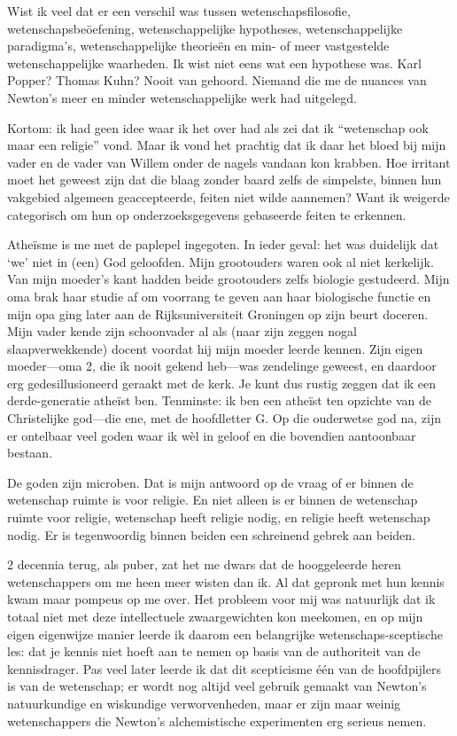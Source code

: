 \documentclass[12pt,a4paper]{article}
\begin{document}
Wist ik veel dat er een verschil was tussen wetenschapsfilosofie, weten\-schaps\-beöef\-ening, wetenschappelijke hypotheses, wetenschappelijke paradigma's, wetenschappelijke theorieën en min- of meer vastgestelde wetenschappelijke waarheden. Ik wist niet eens wat een hypothese was. Karl Popper? Thomas Kuhn? Nooit van gehoord. Niemand die me de nuances van Newton's meer en minder wetenschappelijke werk had uitgelegd.

Kortom: ik had geen idee waar ik het over had als zei dat ik “wetenschap ook maar een religie” vond. Maar ik vond het prachtig dat ik daar het bloed bij mijn vader en de vader van Willem onder de nagels vandaan kon krabben. Hoe irritant moet het geweest zijn dat die blaag zonder baard zelfs de simpelste, binnen hun vakgebied algemeen geaccepteerde, feiten niet wilde aannemen? Want ik weigerde categorisch om hun op onderzoeksgegevens gebaseerde feiten te erkennen.

Atheïsme is me met de paplepel ingegoten. In ieder geval: het was duidelijk dat ‘we’ niet in (een) God geloofden. Mijn grootouders waren ook al niet kerkelijk. Van mijn moeder's kant hadden beide grootouders zelfs biologie gestudeerd. Mijn oma brak haar studie af om voorrang te geven aan haar biologische functie en mijn opa ging later aan de Rijksuniversiteit Groningen op zijn beurt doceren. Mijn vader kende zijn schoonvader al als (naar zijn zeggen nogal slaapverwekkende) docent voordat hij mijn moeder leerde kennen. Zijn eigen moeder—oma 2, die ik nooit gekend heb—was zendelinge geweest, en daardoor erg gedesillusioneerd geraakt met de kerk. Je kunt dus rustig zeggen dat ik een derde-generatie atheïst ben. Tenminste: ik ben een atheïst ten opzichte van de Christelijke god—die ene, met de hoofdletter G. Op die ouderwetse god na, zijn er ontelbaar veel goden waar ik wèl in geloof en die bovendien aantoonbaar bestaan.

De goden zijn microben. Dat is mijn antwoord op de vraag of er binnen de wetenschap ruimte is voor religie. En niet alleen is er binnen de wetenschap ruimte voor religie, wetenschap heeft religie nodig, en religie heeft wetenschap nodig. Er is tegenwoordig binnen beiden een schreinend gebrek aan beiden.

2 decennia terug, als puber, zat het me dwars dat de hooggeleerde heren wetenschappers om me heen meer wisten dan ik. Al dat gepronk met hun kennis kwam maar pompeus op me over. Het probleem voor mij was natuurlijk dat ik totaal niet met deze intellectuele zwaargewichten kon meekomen, en op mijn eigen eigenwijze manier leerde ik daarom een belangrijke wetenschaps-sceptische les: dat je kennis niet hoeft aan te nemen op basis van de authoriteit van de kennisdrager. Pas veel later leerde ik dat dit scepticisme één van de hoofdpijlers is van de wetenschap; er wordt nog altijd veel gebruik gemaakt van Newton's natuurkundige en wiskundige verworvenheden, maar er zijn maar weinig wetenschappers die Newton's alchemistische experimenten erg serieus nemen.
\end{document}
